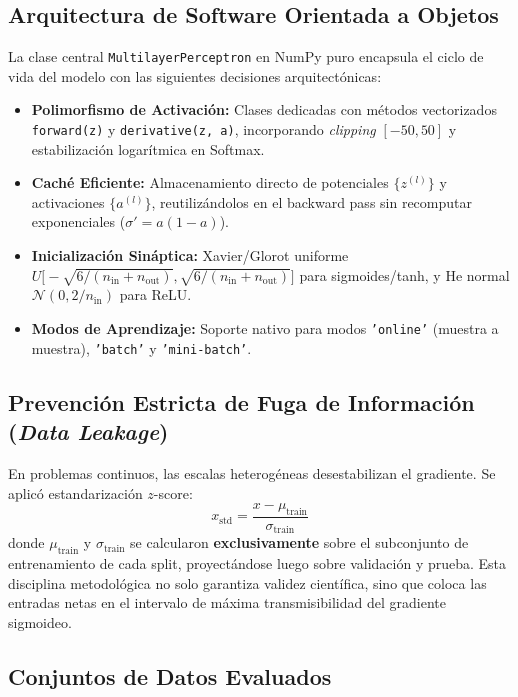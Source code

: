 \documentclass{article}
\begin{document}
\subsection{Arquitectura de Software Orientada a Objetos}

La clase central \texttt{MultilayerPerceptron} en NumPy puro encapsula el ciclo de vida del modelo con las siguientes decisiones arquitectónicas:
\begin{itemize}
    \item \textbf{Polimorfismo de Activación:} Clases dedicadas con métodos vectorizados \texttt{forward(z)} y \texttt{derivative(z, a)}, incorporando \textit{clipping} $[-50, 50]$ y estabilización logarítmica en Softmax.
    \item \textbf{Caché Eficiente:} Almacenamiento directo de potenciales $\{z^{(l)}\}$ y activaciones $\{a^{(l)}\}$, reutilizándolos en el backward pass sin recomputar exponenciales ($\sigma' = a(1-a)$).
    \item \textbf{Inicialización Sináptica:} Xavier/Glorot uniforme $U\big[-\sqrt{6/(n_{\text{in}} + n_{\text{out}})}, \sqrt{6/(n_{\text{in}} + n_{\text{out}})}\big]$ para sigmoides/tanh, y He normal $\mathcal{N}(0, 2/n_{\text{in}})$ para ReLU.
    \item \textbf{Modos de Aprendizaje:} Soporte nativo para modos \texttt{'online'} (muestra a muestra), \texttt{'batch'} y \texttt{'mini-batch'}.
\end{itemize}

\subsection{Prevención Estricta de Fuga de Información (\textit{Data Leakage})}

En problemas continuos, las escalas heterogéneas desestabilizan el gradiente. Se aplicó estandarización $z$-score:
\begin{equation}
    x_{\text{std}} = \frac{x - \mu_{\text{train}}}{\sigma_{\text{train}}} \label{eq:zscore}
\end{equation}
donde $\mu_{\text{train}}$ y $\sigma_{\text{train}}$ se calcularon \textbf{exclusivamente} sobre el subconjunto de entrenamiento de cada split, proyectándose luego sobre validación y prueba. Esta disciplina metodológica no solo garantiza validez científica, sino que coloca las entradas netas en el intervalo de máxima transmisibilidad del gradiente sigmoideo.

\subsection{Conjuntos de Datos Evaluados}
\end{document}
